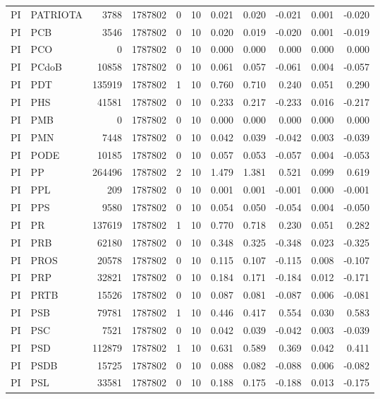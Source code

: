 \begin{landscape}
\begin{longtable}{llrrrrrrrrr}
PI & PATRIOTA & 3788 & 1787802 & 0 & 10 & 0.021 & 0.020 & -0.021 & 0.001 & -0.020 \\
PI & PCB & 3546 & 1787802 & 0 & 10 & 0.020 & 0.019 & -0.020 & 0.001 & -0.019 \\
PI & PCO & 0 & 1787802 & 0 & 10 & 0.000 & 0.000 & 0.000 & 0.000 & 0.000 \\
PI & PCdoB & 10858 & 1787802 & 0 & 10 & 0.061 & 0.057 & -0.061 & 0.004 & -0.057 \\
PI & PDT & 135919 & 1787802 & 1 & 10 & 0.760 & 0.710 & 0.240 & 0.051 & 0.290 \\
PI & PHS & 41581 & 1787802 & 0 & 10 & 0.233 & 0.217 & -0.233 & 0.016 & -0.217 \\
PI & PMB & 0 & 1787802 & 0 & 10 & 0.000 & 0.000 & 0.000 & 0.000 & 0.000 \\
PI & PMN & 7448 & 1787802 & 0 & 10 & 0.042 & 0.039 & -0.042 & 0.003 & -0.039 \\
PI & PODE & 10185 & 1787802 & 0 & 10 & 0.057 & 0.053 & -0.057 & 0.004 & -0.053 \\
PI & PP & 264496 & 1787802 & 2 & 10 & 1.479 & 1.381 & 0.521 & 0.099 & 0.619 \\
PI & PPL & 209 & 1787802 & 0 & 10 & 0.001 & 0.001 & -0.001 & 0.000 & -0.001 \\
PI & PPS & 9580 & 1787802 & 0 & 10 & 0.054 & 0.050 & -0.054 & 0.004 & -0.050 \\
PI & PR & 137619 & 1787802 & 1 & 10 & 0.770 & 0.718 & 0.230 & 0.051 & 0.282 \\
PI & PRB & 62180 & 1787802 & 0 & 10 & 0.348 & 0.325 & -0.348 & 0.023 & -0.325 \\
PI & PROS & 20578 & 1787802 & 0 & 10 & 0.115 & 0.107 & -0.115 & 0.008 & -0.107 \\
PI & PRP & 32821 & 1787802 & 0 & 10 & 0.184 & 0.171 & -0.184 & 0.012 & -0.171 \\
PI & PRTB & 15526 & 1787802 & 0 & 10 & 0.087 & 0.081 & -0.087 & 0.006 & -0.081 \\
PI & PSB & 79781 & 1787802 & 1 & 10 & 0.446 & 0.417 & 0.554 & 0.030 & 0.583 \\
PI & PSC & 7521 & 1787802 & 0 & 10 & 0.042 & 0.039 & -0.042 & 0.003 & -0.039 \\
PI & PSD & 112879 & 1787802 & 1 & 10 & 0.631 & 0.589 & 0.369 & 0.042 & 0.411 \\
PI & PSDB & 15725 & 1787802 & 0 & 10 & 0.088 & 0.082 & -0.088 & 0.006 & -0.082 \\
PI & PSL & 33581 & 1787802 & 0 & 10 & 0.188 & 0.175 & -0.188 & 0.013 & -0.175 \\

\end{longtable}
\end{landscape}
